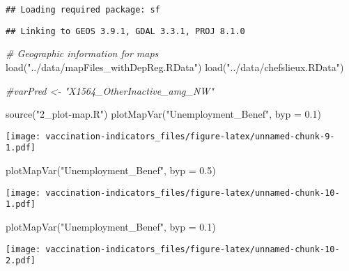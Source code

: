 \documentclass[
]{article}
\newenvironment{Shaded}{\begin{snugshade}}{\end{snugshade}}
\newcommand{\AttributeTok}[1]{\textcolor[rgb]{0.77,0.63,0.00}{#1}}
\newcommand{\CommentTok}[1]{\textcolor[rgb]{0.56,0.35,0.01}{\textit{#1}}}
\newcommand{\FloatTok}[1]{\textcolor[rgb]{0.00,0.00,0.81}{#1}}
\newcommand{\FunctionTok}[1]{\textcolor[rgb]{0.00,0.00,0.00}{#1}}
\newcommand{\NormalTok}[1]{#1}
\newcommand{\StringTok}[1]{\textcolor[rgb]{0.31,0.60,0.02}{#1}}
\begin{document}
\begin{verbatim}
## Loading required package: sf
\end{verbatim}

\begin{verbatim}
## Linking to GEOS 3.9.1, GDAL 3.3.1, PROJ 8.1.0
\end{verbatim}

\begin{Shaded}
\begin{Highlighting}[]
\CommentTok{\# Geographic information for maps}
\FunctionTok{load}\NormalTok{(}\StringTok{"../data/mapFiles\_withDepReg.RData"}\NormalTok{)}
\FunctionTok{load}\NormalTok{(}\StringTok{"../data/chefslieux.RData"}\NormalTok{)}
\end{Highlighting}
\end{Shaded}

\begin{Shaded}
\begin{Highlighting}[]
\CommentTok{\#varPred \textless{}{-} "X1564\_OtherInactive\_amg\_NW"}

\FunctionTok{source}\NormalTok{(}\StringTok{"2\_plot{-}map.R"}\NormalTok{)}
\FunctionTok{plotMapVar}\NormalTok{(}\StringTok{"Unemployment\_Benef"}\NormalTok{, }\AttributeTok{byp =} \FloatTok{0.1}\NormalTok{)}
\end{Highlighting}
\end{Shaded}

\texttt{[image: vaccination-indicators\_files/figure-latex/unnamed-chunk-9-1.pdf]}

\begin{Shaded}
\begin{Highlighting}[]
\FunctionTok{plotMapVar}\NormalTok{(}\StringTok{"Unemployment\_Benef"}\NormalTok{, }\AttributeTok{byp =} \FloatTok{0.5}\NormalTok{)}
\end{Highlighting}
\end{Shaded}

\texttt{[image: vaccination-indicators\_files/figure-latex/unnamed-chunk-10-1.pdf]}

\begin{Shaded}
\begin{Highlighting}[]
\FunctionTok{plotMapVar}\NormalTok{(}\StringTok{"Unemployment\_Benef"}\NormalTok{, }\AttributeTok{byp =} \FloatTok{0.1}\NormalTok{)}
\end{Highlighting}
\end{Shaded}

\texttt{[image: vaccination-indicators\_files/figure-latex/unnamed-chunk-10-2.pdf]}
\end{document}
